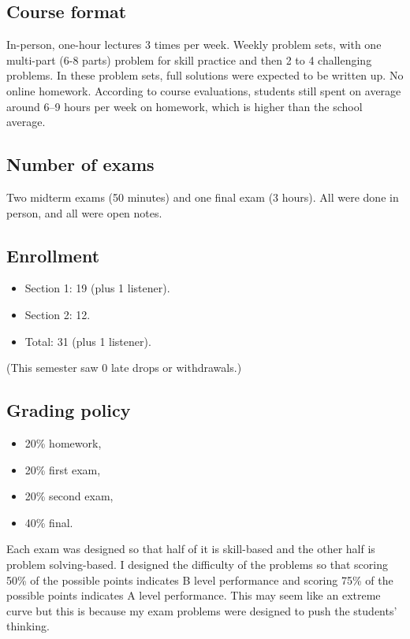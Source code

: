 \documentclass[11pt,oneside]{amsart}
\begin{document}

\subsection{Course format}
In-person, one-hour lectures 3 times per week. Weekly problem sets, with one multi-part (6-8 parts) problem for skill practice and then 2 to 4 challenging problems. In these problem sets, full solutions were expected to be written up. No online homework. According to course evaluations, students still spent on average around 6--9 hours per week on homework, which is higher than the school average.

\subsection{Number of exams}
Two midterm exams (50 minutes) and one final exam (3 hours). All were done in person, and all were open notes.

\subsection{Enrollment}
\begin{itemize}
  \item Section 1: 19 (plus 1 listener).
  \item Section 2: 12.
  \item Total: 31 (plus 1 listener).
\end{itemize}
(This semester saw 0 late drops or withdrawals.)

\subsection{Grading policy}
\begin{itemize}
  \item 20\% homework,
  \item 20\% first exam,
  \item 20\% second exam,
  \item 40\% final.
\end{itemize}
Each exam was designed so that half of it is skill-based and the other  half is problem solving-based. I designed the difficulty of the problems so that scoring 50\% of the possible points indicates B level performance and scoring 75\% of the possible points indicates A level performance. This may seem like an extreme curve but this is because my exam problems were designed to push the students' thinking.
\end{document}
